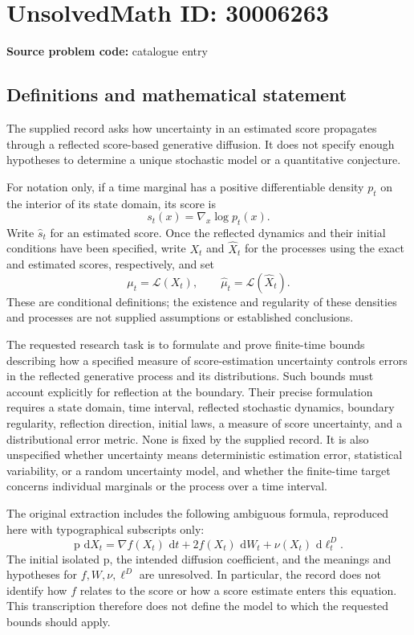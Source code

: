 \documentclass[11pt]{article}
\newcommand{\dd}{\,\mathrm{d}}
\begin{document}
\section*{UnsolvedMath ID: 30006263}
\textbf{Source problem code:} catalogue entry
\subsection{Definitions and mathematical statement}
The supplied record asks how uncertainty in an estimated score propagates through a reflected score-based generative diffusion. It does not specify enough hypotheses to determine a unique stochastic model or a quantitative conjecture.

For notation only, if a time marginal has a positive differentiable density \(p_t\) on the interior of its state domain, its score is
\[
s_t(x)=\nabla_x\log p_t(x).
\]
Write \(\widehat s_t\) for an estimated score. Once the reflected dynamics and their initial conditions have been specified, write \(X_t\) and \(\widehat X_t\) for the processes using the exact and estimated scores, respectively, and set
\[
\mu_t=\mathcal L(X_t),\qquad
\widehat\mu_t=\mathcal L(\widehat X_t).
\]
These are conditional definitions; the existence and regularity of these densities and processes are not supplied assumptions or established conclusions.

The requested research task is to formulate and prove finite-time bounds describing how a specified measure of score-estimation uncertainty controls errors in the reflected generative process and its distributions. Such bounds must account explicitly for reflection at the boundary. Their precise formulation requires a state domain, time interval, reflected stochastic dynamics, boundary regularity, reflection direction, initial laws, a measure of score uncertainty, and a distributional error metric. None is fixed by the supplied record. It is also unspecified whether uncertainty means deterministic estimation error, statistical variability, or a random uncertainty model, and whether the finite-time target concerns individual marginals or the process over a time interval.

The original extraction includes the following ambiguous formula, reproduced here with typographical subscripts only:
\[
\text{p}\,\dd X_t
 =\nabla f(X_t)\,\dd t
  +2f(X_t)\,\dd W_t
  +\nu(X_t)\,\dd\ell_t^D.
\]
The initial isolated \(\text{p}\), the intended diffusion coefficient, and the meanings and hypotheses for \(f,W,\nu,\ell^D\) are unresolved. In particular, the record does not identify how \(f\) relates to the score or how a score estimate enters this equation. This transcription therefore does not define the model to which the requested bounds should apply.
\end{document}
